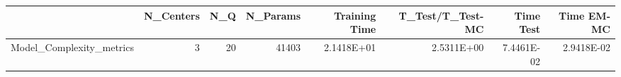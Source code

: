 \begin{tabular}{lrrrrrrr}
\toprule
{} &  N\_Centers &  N\_Q &  N\_Params &  Training Time &  T\_Test/T\_Test-MC &  Time Test &  Time EM-MC \\
\midrule
Model\_Complexity\_metrics &          3 &   20 &     41403 &     2.1418E+01 &        2.5311E+00 & 7.4461E-02 &  2.9418E-02 \\
\bottomrule
\end{tabular}
